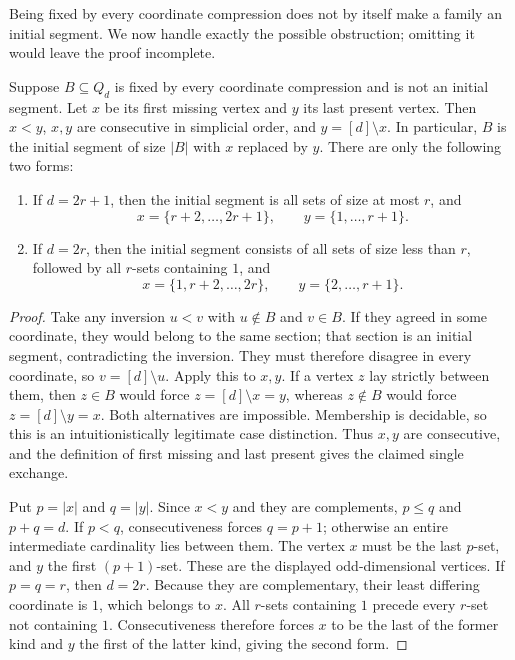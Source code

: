 Being fixed by every coordinate compression does not by itself make a
family an initial segment.  We now handle exactly the possible obstruction;
omitting it would leave the proof incomplete.

\begin{lemma}
\label{lem:cube-exceptions}
Suppose \(B\subseteq Q_d\) is fixed by every coordinate compression and
is not an initial segment.  Let \(x\) be its first missing vertex and
\(y\) its last present vertex.  Then \(x<y\), \(x,y\) are consecutive
in simplicial order, and \(y=[d]\setminus x\).  In particular, \(B\)
is the initial segment of size \(|B|\) with \(x\) replaced by \(y\).
There are only the following two forms:
\begin{enumerate}
\item If \(d=2r+1\), then the initial segment is all sets of size at most
\(r\), and
\[
 x=\{r+2,\ldots,2r+1\},\qquad y=\{1,\ldots,r+1\}.
\]
\item If \(d=2r\), then the initial segment consists of all sets of size
less than \(r\), followed by all \(r\)-sets containing \(1\), and
\[
 x=\{1,r+2,\ldots,2r\},\qquad y=\{2,\ldots,r+1\}.
\]
\end{enumerate}
\end{lemma}
\begin{proof}
Take any inversion \(u<v\) with \(u\notin B\) and \(v\in B\).
If they agreed in some coordinate, they would belong to the same section;
that section is an initial segment, contradicting the inversion.
They must therefore disagree in every coordinate, so \(v=[d]\setminus u\).
Apply this to \(x,y\).  If a vertex \(z\) lay strictly between them,
then \(z\in B\) would force \(z=[d]\setminus x=y\), whereas
\(z\notin B\) would force \(z=[d]\setminus y=x\).
Both alternatives are impossible.  Membership is decidable, so this is
an intuitionistically legitimate case distinction.  Thus \(x,y\) are
consecutive, and the definition of first missing and last present gives
the claimed single exchange.

Put \(p=|x|\) and \(q=|y|\).  Since \(x<y\) and they are
complements, \(p\leq q\) and \(p+q=d\).
If \(p<q\), consecutiveness forces \(q=p+1\); otherwise an entire
intermediate cardinality lies between them.  The vertex \(x\) must be
the last \(p\)-set, and \(y\) the first \((p+1)\)-set.  These are the
displayed odd-dimensional vertices.
If \(p=q=r\), then \(d=2r\).  Because they are complementary, their
least differing coordinate is \(1\), which belongs to \(x\).
All \(r\)-sets containing \(1\) precede every \(r\)-set not containing
\(1\).  Consecutiveness therefore forces \(x\) to be the last of the
former kind and \(y\) the first of the latter kind, giving the second
form.
\end{proof}

